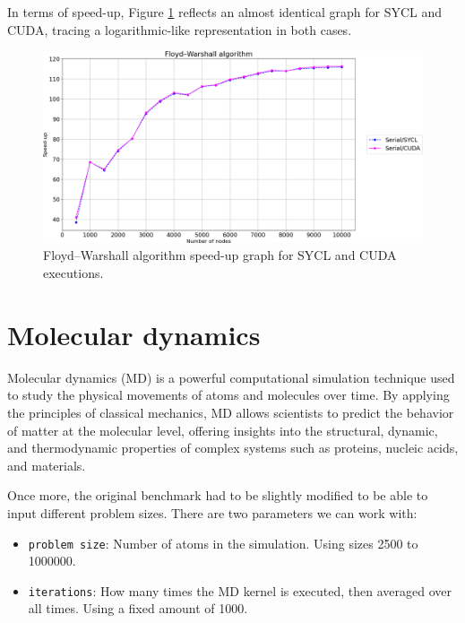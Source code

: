In terms of speed-up, Figure \ref{fig:floydwarshall-speed-up} reflects an almost identical graph for SYCL and CUDA, tracing a logarithmic-like representation in both cases.

\begin{figure}[H]
	\centering
	\includegraphics[width=\linewidth]{images/floydwarshall-speed-up-sycl-cuda.png}
	\caption{Floyd–Warshall algorithm speed-up graph for SYCL and CUDA executions.}
	\label{fig:floydwarshall-speed-up}
\end{figure}

\section{Molecular dynamics}
Molecular dynamics (MD) is a powerful computational simulation technique used to study the physical movements of atoms and molecules over time.
By applying the principles of classical mechanics, MD allows scientists to predict the behavior of matter at the molecular level, offering insights into the structural, dynamic, and thermodynamic properties of complex systems such as proteins, nucleic acids, and materials.

Once more, the original benchmark had to be slightly modified to be able to input different problem sizes.
There are two parameters we can work with:
\begin{itemize}
    \item \texttt{problem size}: Number of atoms in the simulation. Using sizes 2500 to 1000000.
    \item \texttt{iterations}: How many times the MD kernel is executed, then averaged over all times. Using a fixed amount of 1000.
\end{itemize}


